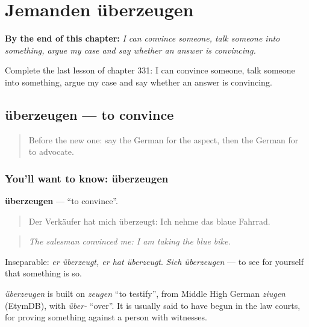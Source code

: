 
\chapter{Jemanden überzeugen}
\label{ch:ge-jemanden-uberzeugen}

\begin{chapteropening}
\textbf{By the end of this chapter:} \emph{I can convince someone, talk someone into something, argue my case and say whether an answer is convincing.}

Complete the last lesson of chapter 331: I can convince someone, talk someone into something, argue my case and say whether an answer is convincing.
\end{chapteropening}

\section[überzeugen]{überzeugen — to convince}

\label{lesson:GE-C331-ueberzeugen}



\begin{quote}
Before the new one: say the German for the aspect, then the German for to advocate.
\end{quote}

\subsection*{You'll want to know: überzeugen}
\textbf{überzeugen} — \textquotedblleft{}to convince\textquotedblright{}.

\begin{quote}
Der Verkäufer hat mich überzeugt: Ich nehme das blaue Fahrrad.
\end{quote}

\begin{quote}
\emph{The salesman convinced me: I am taking the blue bike.}
\end{quote}

Inseparable: \emph{er überzeugt, er hat überzeugt}. \emph{Sich überzeugen} — to see for yourself that something is so.

\begin{cousinweb}
\emph{überzeugen} is built on \emph{zeugen} \textquotedblleft{}to testify\textquotedblright{}, from Middle High German \emph{ziugen} (EtymDB), with \emph{über-} \textquotedblleft{}over\textquotedblright{}. It is usually said to have begun in the law courts, for proving something against a person with witnesses.
\end{cousinweb}

